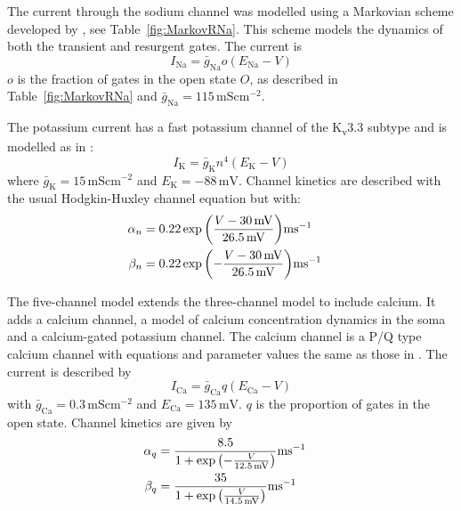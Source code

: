 \documentclass[utf8]{frontiersSCNS} %
\newcommand{\mv}{\,\mathrm{mV}}
\newcommand{\msi}{\,\mathrm{mS cm^{-2}}}
\renewcommand{\k}{\mathrm{K}}
\newcommand{\ca}{\mathrm{Ca}}
\newcommand{\na}{\mathrm{Na}}
\begin{document}
The current through the sodium channel was modelled using a Markovian scheme developed by \cite{RamanBean2001}, see
Table~\ref{fig:MarkovRNa}. This scheme models the dynamics of both the transient and resurgent gates. The current is
\begin{equation}
\label{eq:I_RNa}
I_{\na} = \bar{g}_\na o (E_\na-V)
\end{equation}
$o$ is the fraction of gates in the open state $O$, as described in Table~\ref{fig:MarkovRNa} and $\bar{g}_\na=115\msi$.


The potassium current has a fast potassium channel of the K\textsubscript{v}3.3 subtype and is modelled as in
\cite{MasoliEtAl2015}:
\begin{equation}
\label{eq:I_K}
I_{\k} = \bar{g}_{\k} n^4(E_{\k}-V)
\end{equation}
where $\bar{g}_{\k}= 15\msi$ and $E_{\k}=-88\mv$. Channel kinetics are described with the usual Hodgkin-Huxley channel equation but with:
\begin{align}
\label{eq:n_kinetics}
\alpha_{n} &= 0.22
\exp{\left(\frac{V-30\mv}{26.5\mv}\right)}\mathrm{ms}^{-1}\cr 
\beta_{n} &= 0.22
\exp{\left(-\frac{V-30\mv}{26.5\mv}\right)}\mathrm{ms}^{-1}
\end{align}

The five-channel model extends the three-channel model to include
calcium. It adds a calcium channel, a model of calcium concentration
dynamics in the soma and a calcium-gated potassium channel. The
calcium channel is a P/Q type calcium channel with equations and
parameter values the same as those in \cite{MiyashoEtAl2001}. The
current is described by
\begin{equation}
\label{eq:I_Ca}
I_\ca =\bar{g}_{\ca} q(E_\ca-V)
\end{equation}
with $\bar{g}_\ca= 0.3\msi$ and $E_\ca = 135\mv$. $q$ is the proportion of gates in the open state. Channel kinetics are given by
\begin{align}
\label{eq:q_kinetics}
\alpha_{q} &= \frac{8.5}{ 1 +
  \exp{\left(-\frac{V}{12.5\mv}\right)}}\mathrm{ms}^{-1}\cr \beta_{q} &=
\frac{35}{ 1 + \exp{\left(\frac{V}{14.5\mv}\right)}}\mathrm{ms}^{-1}
\end{align}

\end{document}
